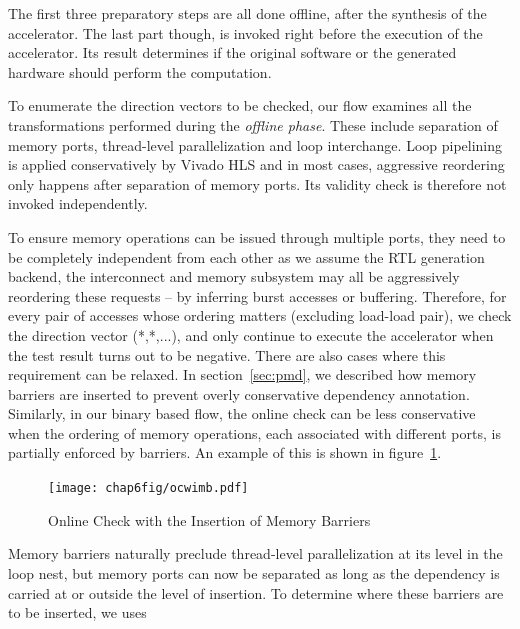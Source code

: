 The first three preparatory steps are all done offline,  after the synthesis of the accelerator. The last part though, is invoked right before the execution of the
accelerator. Its result determines if the original software or the generated
hardware should perform the computation.


To enumerate the direction vectors to be checked, our flow examines all the 
transformations performed during the \textit{offline phase}. These 
include separation of memory ports, thread-level parallelization and loop interchange. Loop pipelining is
applied conservatively by Vivado HLS and in most cases, aggressive reordering only happens after separation of memory ports. Its validity check is therefore not invoked independently.  

To ensure memory operations can be issued through multiple ports, they need to be completely independent from each other as we assume the RTL generation backend, the interconnect and memory subsystem may all be
aggressively reordering these requests -- by inferring burst accesses or buffering. Therefore, for every pair of accesses whose ordering matters (excluding load-load pair), we check the direction vector (*,*,...), and only continue to execute the accelerator when the test result turns out to be negative. There are also cases where this requirement can be relaxed. In section~\ref{sec:pmd}, we described how memory barriers are inserted to prevent overly conservative dependency annotation.
Similarly, in our binary based flow, the online check can be less conservative
when the ordering of memory operations, each associated with different ports, is partially enforced by barriers.
An example of this is shown in figure~\ref{fig:withOrWithoutBarrier}. 

\begin{figure}[htp]
\begin{center}
\texttt{[image: chap6fig/ocwimb.pdf]}
\caption{Online Check with the Insertion of Memory Barriers 
\label{fig:withOrWithoutBarrier}}
\end{center}
\end{figure}


Memory barriers naturally preclude thread-level parallelization at its level in the loop nest, but memory ports can now be separated as long as the dependency is   carried at or outside the level of insertion. To determine where these barriers
are to be inserted, we uses
 




